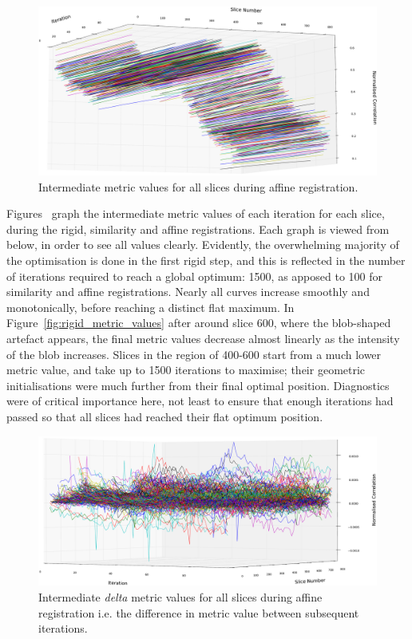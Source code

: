   \begin{figure}
    \centering
    \includegraphics[width=\textheight]{Ch5/Figs/diagnostics/affine_metric_values}
    \caption{Intermediate metric values for all slices during affine registration.}
    \label{fig:affine_metric_values}
  \end{figure}
  
	Figures~ graph the intermediate metric values of each iteration for each slice, during the rigid, similarity and affine registrations. Each graph is viewed from below, in order to see all values clearly. Evidently, the overwhelming majority of the optimisation is done in the first rigid step, and this is reflected in the number of iterations required to reach a global optimum: 1500, as apposed to 100 for similarity and affine registrations. Nearly all curves increase smoothly and monotonically, before reaching a distinct flat maximum. In Figure~\ref{fig:rigid_metric_values} after around slice 600, where the blob-shaped artefact appears, the final metric values decrease almost linearly as the intensity of the blob increases. Slices in the region of 400-600 start from a much lower metric value, and take up to 1500 iterations to maximise; their geometric initialisations were much further from their final optimal position. Diagnostics were of critical importance here, not least to ensure that enough iterations had passed so that all slices had reached their flat optimum position.
	
  \begin{figure}
    \centering
    \includegraphics[width=\textheight]{Ch5/Figs/diagnostics/affine_metric_value_differences}
    \caption{Intermediate \emph{delta} metric values for all slices during affine registration i.e. the difference in metric value between subsequent iterations.}
    \label{fig:affine_metric_value_differences}
  \end{figure}
  

